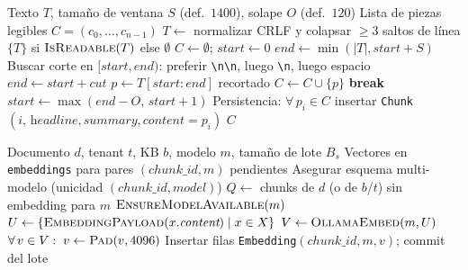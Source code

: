 \begin{algorithm}[htbp]
\caption{Fragmentación con solape (\texttt{split\_into\_chunks})}
\label{alg:split-chunks}
\begin{algorithmic}[1]
\Require Texto $T$, tamaño de ventana $S$ (def.\ $1400$), solape $O$ (def.\ $120$)
\Ensure Lista de piezas legibles $C = (c_0,\ldots,c_{n-1})$
\State $T \gets$ normalizar CRLF y colapsar $\ge 3$ saltos de línea
  \State \Return $\{T\}$ si $\textsc{IsReadable}(T)$ else $\emptyset$
\EndIf
\State $C \gets \emptyset$;\; $\textit{start} \gets 0$
  \State $\textit{end} \gets \min(|T|, \textit{start}+S)$
    \State Buscar corte en $[\textit{start},\textit{end})$: preferir \texttt{\textbackslash n\textbackslash n}, luego \texttt{\textbackslash n}, luego espacio
      \State $\textit{end} \gets \textit{start} + \textit{cut}$
    \EndIf
  \EndIf
  \State $p \gets T[\textit{start}:\textit{end}]$ recortado
    \State $C \gets C \cup \{p\}$
  \EndIf
   \textbf{break} \EndIf
  \State $\textit{start} \gets \max(\textit{end}-O,\, \textit{start}+1)$
\EndWhile
\State Persistencia: $\forall\, p_i \in C$ insertar \texttt{Chunk}$(i,\,\textit{headline},\textit{summary},\textit{content}{=}p_i)$
\State \Return $C$
\end{algorithmic}
\end{algorithm}

\begin{algorithm}[htbp]
\caption{Embedding por lotes y persistencia pgvector}
\label{alg:embed-store}
\begin{algorithmic}[1]
\Require Documento $d$, tenant $t$, KB $b$, modelo $m$, tamaño de lote $B_s$
\Ensure Vectores en \texttt{embeddings} para pares $(chunk\_id, m)$ pendientes
\State Asegurar esquema multi-modelo (unicidad $(chunk\_id, model)$)
\State $Q \gets$ chunks de $d$ (o de $b$/$t$) sin embedding para $m$
\State $\textsc{EnsureModelAvailable}(m)$ 
  \State $U \gets \{\textsc{EmbeddingPayload}(x.\textit{content}) \mid x \in X\}$
  \State $V \gets \textsc{OllamaEmbed}(m, U)$ 
  \State $\forall\, v \in V:\; v \gets \textsc{Pad}(v, 4096)$
  \State Insertar filas \texttt{Embedding}$(chunk\_id, m, v)$; commit del lote
\EndFor
\end{algorithmic}
\end{algorithm}

